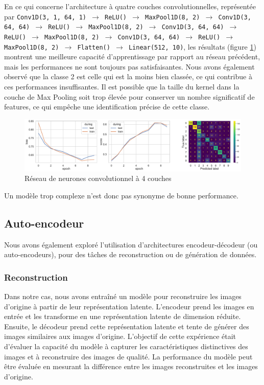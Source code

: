 \documentclass{article}
\begin{document}
En ce qui concerne l'architecture à quatre couches convolutionnelles, représentée par \texttt{Conv1D(3, 1, 64, 1) $\rightarrow$ ReLU() $\rightarrow$ MaxPool1D(8, 2) $\rightarrow$ Conv1D(3, 64, 64) $\rightarrow$ ReLU() $\rightarrow$ MaxPool1D(8, 2) $\rightarrow$ Conv1D(3, 64, 64) $\rightarrow$ ReLU() $\rightarrow$ MaxPool1D(8, 2) $\rightarrow$ Conv1D(3, 64, 64) $\rightarrow$ ReLU() $\rightarrow$ MaxPool1D(8, 2) $\rightarrow$ Flatten() $\rightarrow$ Linear(512, 10)}, les résultats (figure \ref{fig:conv4layers}) montrent une meilleure capacité d'apprentissage par rapport au réseau précédent, mais les performances ne sont toujours pas satisfaisantes. Nous avons également observé que la classe 2 est celle qui est la moins bien classée, ce qui contribue à ces performances insuffisantes. Il est possible que la taille du kernel dans la couche de Max Pooling soit trop élevée pour conserver un nombre significatif de features, ce qui empêche une identification précise de cette classe.

\begin{figure}[htbp]
    \centering
    \includegraphics[width=\textwidth]{conv/conv_4layers.pdf}
    \caption{Réseau de neurones convolutionnel à 4 couches}
    \label{fig:conv4layers}
\end{figure}

Un modèle trop complexe n'est donc pas synonyme de bonne performance.

\subsection{Auto-encodeur}


Nous avons également exploré l'utilisation d'architectures encodeur-décodeur (ou auto-encodeurs), pour des tâches de reconstruction ou de génération de données.

\subsubsection{Reconstruction}

Dans notre cas, nous avons entraîné un modèle pour reconstruire les images d'origine à partir de leur représentation latente. L'encodeur prend les images en entrée et les transforme en une représentation latente de dimension réduite. Ensuite, le décodeur prend cette représentation latente et tente de générer des images similaires aux images d'origine. L'objectif de cette expérience était d'évaluer la capacité du modèle à capturer les caractéristiques distinctives des images et à reconstruire des images de qualité. La performance du modèle peut être évaluée en mesurant la différence entre les images reconstruites et les images d'origine.
\end{document}
